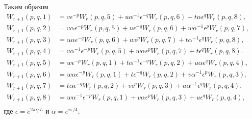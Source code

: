 \documentclass[utf8,12pt]{jetp}
\begin{document}
Таким образом
\begin{align}
	W_{r+1} (p, q, 1) &= v \epsilon^{-p} W_r(p,q,5) + u \alpha^{-1}\epsilon^{-q} W_r(p,q,6) + t \alpha \epsilon^{q} W_r(p,q,8),\nonumber\\
	W_{r+1} (p, q, 2) &= v \alpha \epsilon^{-p} W_r(p,q,5) + u \epsilon^{-q} W_r(p,q,6) + w \alpha^{-1} \epsilon^{p} W_r(p,q,7),\nonumber\\
	W_{r+1} (p, q, 3) &= u \alpha \epsilon^{-q} W_r(p,q,6) + w \epsilon^{p} W_r(p,q,7) + t \alpha^{-1} \epsilon^{q} W_r(p,q,8),\nonumber\\
	W_{r+1} (p, q, 4) &= v \alpha^{-1} \epsilon^{-p} W_r(p,q,5) + w \alpha \epsilon^{p} W_r(p,q,7) + t \epsilon^{q} W_r(p,q,8).\nonumber\\
	W_{r+1} (p, q, 5) &= w \epsilon^{-p} W_r(p,q,1) + t \alpha^{-1} \epsilon^{-q} W_r(p,q,2) + u \alpha \epsilon^{q} W_r(p,q,4), \nonumber\\
	W_{r+1} (p, q, 6) &= w \alpha \epsilon^{-p} W_r(p,q,1) + t \epsilon^{-q} W_r(p,q,2) + v \alpha^{-1} \epsilon^{p} W_r(p,q,3),\nonumber\\
	W_{r+1} (p, q, 7) &= t \alpha \epsilon^{-q} W_r(p,q,2) + v \epsilon^{p} W_r(p,q,3) + u \alpha^{-1} \epsilon^{q} W_r(p,q,4),\nonumber\\
	W_{r+1} (p, q, 8) &= w \alpha^{-1} \epsilon^{-p} W_r(p,q,1) + v \alpha \epsilon^{p} W_r(p,q,3) + u \epsilon^{q} W_r(p,q,4),\nonumber\\
	\label{reccursiveWFurie}
\end{align}
где $\epsilon = e^{2\pi i/L}$ и $\alpha = e^{i\pi /4}$.
\end{document}
